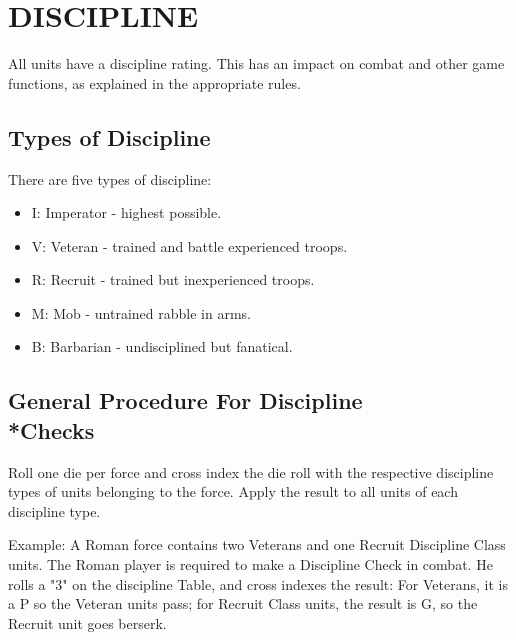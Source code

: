 \section{DISCIPLINE}

All units have a discipline rating. This has an impact on combat and other game functions, as explained in the appropriate rules.

\subsection{Types of Discipline}

There are five types of discipline:

\begin{itemize}
  \item I: Imperator - highest possible.
  \item V: Veteran - trained and battle experienced troops.
  \item R: Recruit - trained but inexperienced troops.
  \item M: Mob - untrained rabble in arms.
  \item B: Barbarian - undisciplined but fanatical.
\end{itemize}

\subsection{General Procedure For Discipline\\*Checks}

Roll one die per force and cross index the die roll with the respective discipline types of units belonging to the force. Apply the result to all units of each discipline type.

Example: A Roman force contains two Veterans and one Recruit Discipline Class units. The Roman player is required to make a Discipline Check in combat. He rolls a "3" on the discipline Table, and cross indexes the result: For Veterans, it is a P so the Veteran units pass; for Recruit Class units, the result is G, so the Recruit unit goes berserk.